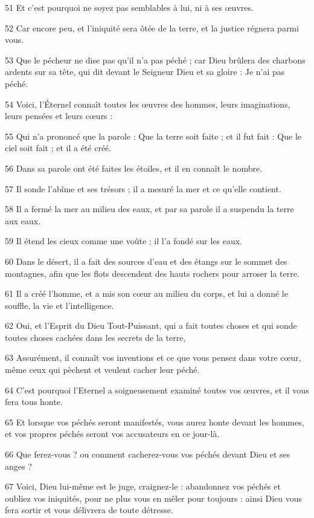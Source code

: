 \par 51 Et c'est pourquoi ne soyez pas semblables à lui, ni à ses œuvres.
\par 52 Car encore peu, et l'iniquité sera ôtée de la terre, et la justice régnera parmi vous.
\par 53 Que le pécheur ne dise pas qu'il n'a pas péché ; car Dieu brûlera des charbons ardents sur sa tête, qui dit devant le Seigneur Dieu et sa gloire : Je n'ai pas péché.
\par 54 Voici, l'Éternel connaît toutes les œuvres des hommes, leurs imaginations, leurs pensées et leurs cœurs :
\par 55 Qui n'a prononcé que la parole : Que la terre soit faite ; et il fut fait : Que le ciel soit fait ; et il a été créé.
\par 56 Dans sa parole ont été faites les étoiles, et il en connaît le nombre.
\par 57 Il sonde l'abîme et ses trésors ; il a mesuré la mer et ce qu'elle contient.
\par 58 Il a fermé la mer au milieu des eaux, et par sa parole il a suspendu la terre aux eaux.
\par 59 Il étend les cieux comme une voûte ; il l'a fondé sur les eaux.
\par 60 Dans le désert, il a fait des sources d'eau et des étangs sur le sommet des montagnes, afin que les flots descendent des hauts rochers pour arroser la terre.
\par 61 Il a créé l'homme, et a mis son cœur au milieu du corps, et lui a donné le souffle, la vie et l'intelligence.
\par 62 Oui, et l'Esprit du Dieu Tout-Puissant, qui a fait toutes choses et qui sonde toutes choses cachées dans les secrets de la terre,
\par 63 Assurément, il connaît vos inventions et ce que vous pensez dans votre cœur, même ceux qui pèchent et veulent cacher leur péché.
\par 64 C'est pourquoi l'Eternel a soigneusement examiné toutes vos œuvres, et il vous fera tous honte.
\par 65 Et lorsque vos péchés seront manifestés, vous aurez honte devant les hommes, et vos propres péchés seront vos accusateurs en ce jour-là.
\par 66 Que ferez-vous ? ou comment cacherez-vous vos péchés devant Dieu et ses anges ?
\par 67 Voici, Dieu lui-même est le juge, craignez-le : abandonnez vos péchés et oubliez vos iniquités, pour ne plus vous en mêler pour toujours : ainsi Dieu vous fera sortir et vous délivrera de toute détresse.
